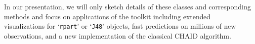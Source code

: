 \documentclass[10pt,a4paper]{article}
\let\code=\texttt
\newcommand{\class}[1]{`\code{#1}'}
\begin{document}
In our presentation, we will only sketch details of these classes and 
corresponding methods and focus on applications of the toolkit including
extended visualizations for \class{rpart} or \class{J48} objects, fast predictions
on millions of new observations, and a new implementation of the classical CHAID
algorithm.



\end{document}
